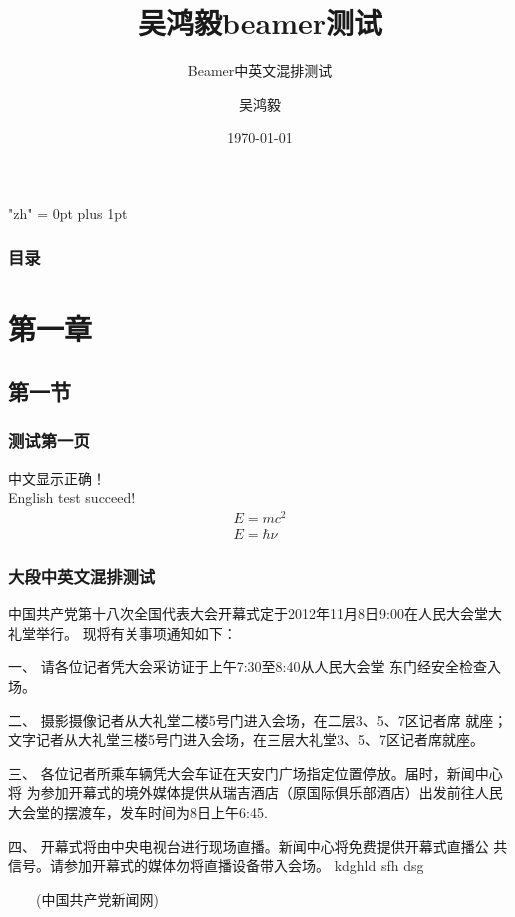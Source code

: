 \documentclass[presentation]{beamer}
\title{吴鸿毅beamer测试}
\subtitle{Beamer中英文混排测试}
\author{吴鸿毅}
\institute{哈尔滨工程大学 核科学与技术学院}
\date{\today}
\begin{document}
\XeTeXlinebreaklocale "zh"  %
\XeTeXlinebreakskip = 0pt plus 1pt %


\begin{frame}
\titlepage


\end{frame}


\begin{frame}
\frametitle{目录}
    \tableofcontents     %


\end{frame}




\section{第一章}
\subsection{第一节}


\begin{frame}
   \frametitle{测试第一页}


   中文显示正确！\\
English test succeed!\\
\begin{align}\label{eq:ei}
    E=mc^2\\
    E=\hbar \nu
\end{align}


\end{frame}




\begin{frame}[allowframebreaks]
\frametitle{大段中英文混排测试}
中国共产党第十八次全国代表大会开幕式定于2012年11月8日9:00在人民大会堂大礼堂举行。
现将有关事项通知如下：


一、 请各位记者凭大会采访证于上午7:30至8:40从人民大会堂
东门经安全检查入场。


二、 摄影摄像记者从大礼堂二楼5号门进入会场，在二层3、5、7区记者席
就座；文字记者从大礼堂三楼5号门进入会场，在三层大礼堂3、5、7区记者席就座。


三、 各位记者所乘车辆凭大会车证在天安门广场指定位置停放。届时，新闻中心将
为参加开幕式的境外媒体提供从瑞吉酒店（原国际俱乐部酒店）出发前往人民
大会堂的摆渡车，发车时间为8日上午6:45.


四、 开幕式将由中央电视台进行现场直播。新闻中心将免费提供开幕式直播公
共信号。请参加开幕式的媒体勿将直播设备带入会场。
kdghld sfh dsg

　　(中国共产党新闻网)
\end{frame}
\end{document}
